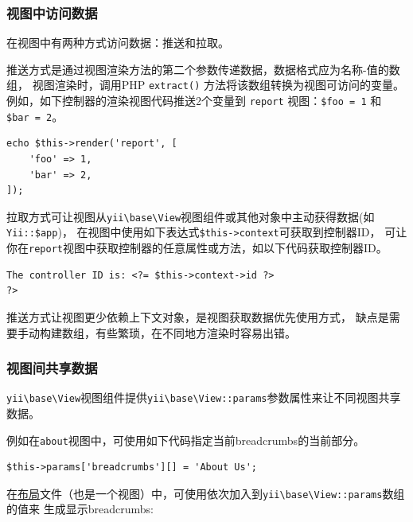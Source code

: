 \subsubsection{视图中访问数据 \label{structure-views.md::accessing-data-in-views}}
在视图中有两种方式访问数据：推送和拉取。

推送方式是通过视图渲染方法的第二个参数传递数据，数据格式应为名称-值的数组，
视图渲染时，调用PHP \lstinline|extract()| 方法将该数组转换为视图可访问的变量。
例如，如下控制器的渲染视图代码推送2个变量到 \lstinline|report| 视图：\lstinline|$foo = 1| 和 \lstinline|$bar = 2|。

\lstset{language=php}\begin{lstlisting}
echo $this->render('report', [
    'foo' => 1,
    'bar' => 2,
]);
\end{lstlisting}
拉取方式可让视图从\texttt{yii{\allowbreak{}\textbackslash}base{\allowbreak{}\textbackslash}View}视图组件或其他对象中主动获得数据(如\lstinline|Yii::$app|)，
在视图中使用如下表达式\lstinline|$this->context|可获取到控制器ID，
可让你在\lstinline|report|视图中获取控制器的任意属性或方法，如以下代码获取控制器ID。

\lstset{language=php}\begin{lstlisting}
The controller ID is: <?= $this->context->id ?>
?>
\end{lstlisting}
推送方式让视图更少依赖上下文对象，是视图获取数据优先使用方式，
缺点是需要手动构建数组，有些繁琐，在不同地方渲染时容易出错。

\subsubsection{视图间共享数据 \label{structure-views.md::sharing-data-among-views}}
\texttt{yii{\allowbreak{}\textbackslash}base{\allowbreak{}\textbackslash}View}视图组件提供\texttt{yii{\allowbreak{}\textbackslash}base{\allowbreak{}\textbackslash}View\allowbreak{}::\allowbreak{}params}参数属性来让不同视图共享数据。

例如在\lstinline|about|视图中，可使用如下代码指定当前breadcrumbs的当前部分。

\lstset{language=php}\begin{lstlisting}
$this->params['breadcrumbs'][] = 'About Us';
\end{lstlisting}
在\hyperref[structure-views.md::::layouts]{布局}文件（也是一个视图）中，可使用依次加入到\texttt{yii{\allowbreak{}\textbackslash}base{\allowbreak{}\textbackslash}View\allowbreak{}::\allowbreak{}params}数组的值来
生成显示breadcrumbs:

